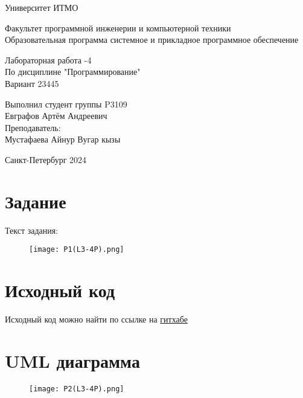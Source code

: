 

\thispagestyle{empty}
\begin{center}
\LARGE{Университет ИТМО} 
\vspace{20pt}

\LARGE{Факультет программной инженерии и компьютерной техники \\
Образовательная программа системное и прикладное программное обеспечение}
\vspace{160pt}

\LARGE{Лабораторная работа  -4 \\
По дисциплине "Программирование" \\ 
Вариант 23445}
\vspace{120pt}
\end{center}

\begin{flushright}
\LARGE{Выполнил студент группы P3109 \\ 
Евграфов Артём Андреевич \\
Преподаватель: \\
Мустафаева Айнур Вугар кызы}
\vspace{120pt}
\end{flushright}

\begin{center}
\Large{Санкт-Петербург 2024}
\end{center}

\newpage
\setcounter{page}{1}
\tableofcontents
\newpage

\section{Задание}
Текст задания:
\begin{figure}[H]
    \centering
    \texttt{[image: P1(L3-4P).png]}
\end{figure}

\section{Исходный код}
Исходный код можно найти по ссылке на \href{https://github.com/evgrart/ITMO/tree/main/programming/1sem/lab3}{гитхабе}

\section{UML диаграмма}
\begin{figure}[H]
    \centering
    \texttt{[image: P2(L3-4P).png]}
\end{figure}

